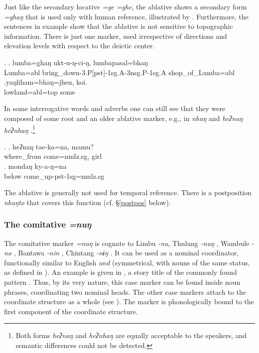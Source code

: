 Just like the secondary locative \emph{=ge \ti =ghe}, the ablative shows a secondary form \emph{=ghaŋ} that is used only with human reference, illustrated  by \Next[a]. Furthermore, the sentences in example \Next show that the ablative is not sensitive to topographic information. There is just one marker, used irrespective of directions and elevation levels with respect to the deictic center.

\ex. \ag. lumba=ghaŋ     ukt-u-ŋ-ci-ŋ,                               lumbapasal=bhaŋ\\
Lumba{\sc =abl} bring\_down{\sc -3.P[pst]-1sg.A-3nsg.P-1sg.A} shop\_of\_Lumba{\sc =abl}\\
 
\bg.yaŋliham=bhaŋ=jhen,    koi.\\
lowland{\sc =abl=top} some\\
 
 
 In some interrogative words and adverbs one can still see that they were composed of some root and an older ablative marker, e.g.,  in \emph{nhaŋ}  and \emph{heʔnaŋ \ti heʔnhaŋ} .\footnote{Both forms  \emph{heʔnaŋ} and \emph{heʔnhaŋ} are equally acceptable to the speakers, and semantic differences could not be detected.} 

\ex. \ag. heʔnaŋ tae-ka=na, mamu?\\
		where\_from come{=nmlz.sg}, girl\\
	\bg. mondaŋ ky-a-ŋ=na \\
		below{\sc [abl]} come\_up{\sc -pst-1sg=nmlz.sg}\\
		
The ablative is generally not used for temporal reference. There is a postposition \emph{nhaŋto} that covers this function (cf. §\ref{postpos} below).
 

\subsubsection{The comitative  \emph{=nuŋ}}\label{case-com}

The comitative marker  \emph{=nuŋ} is cognate to Limbu \emph{-nu},  Thulung \emph{-nuŋ} \citep[81]{Ebert1994The-structure}, Wambule \emph{-no} \citep[157]{Opgenort2004A-Grammar}, Bantawa \emph{-nin} \citep[91]{Doornenbal2009A-grammar}, Chintang \emph{-nɨŋ} \citep[80]{Schikowski2012_Morphology}. It can be used as a nominal coordinator, functionally similar to English \emph{and}  (symmetrical, with nouns of the same status, as defined in  \citet[3]{Haspelmath2004_overview}). An example is given in \Next[a], a story title of the commonly found pattern . Thus, by its very nature, this case marker can be found inside noun phrases, coordinating two nominal heads. The other case markers attach to the coordinate structure as a whole (see \Next[b]). The marker is phonologically bound to the first component of the coordinate structure.

